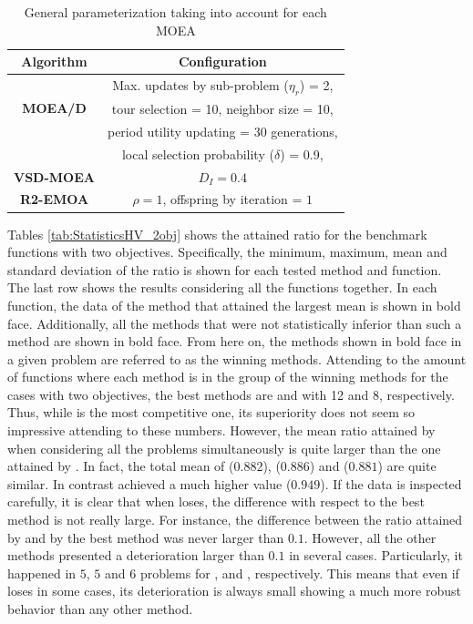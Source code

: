 %
\begin{table}[t]
\centering
\caption{ General parameterization taking into account for each MOEA}
\label{tab:Parametrization}
\begin{tabular}{c|c}
\hline
\textbf{Algorithm} & \textbf{Configuration} \\ \hline
\multirow{3}{*}{\textbf{MOEA/D}} &Max. updates by sub-problem ($\eta_r$) = 2, \\
 & tour selection = 10,   neighbor size = 10, \\
 & period utility updating = 30 generations, \\ 
 & local selection probability ($\delta$) = 0.9,\\ \hline
\textbf{VSD-MOEA} & $D_I=0.4$ \\ \hline
\textbf{R2-EMOA} & $\rho=1$, offspring by iteration = $1$ \\ \hline
\end{tabular}
\end{table}







Tables \ref{tab:StatisticsHV_2obj} shows the attained \HV{} ratio for the benchmark functions
with two objectives.
%
Specifically, the minimum, maximum, mean and standard deviation of the \HV{} ratio is shown for each tested method and function.
%
The last row shows the results considering all the functions together.
%
In each function, the data of the method that attained the largest mean is shown in bold face.
%
Additionally, all the methods that were not statistically inferior than such a method are shown in bold face.
%
From here on, the methods shown in bold face in a given problem are referred to as the winning methods.
%
Attending to the amount of functions where each method is in the group of the winning methods for the cases 
with two objectives, the best methods are \VSDMOEA{} and \RMOEA{} with 12 and 8, respectively.
%
Thus, while \VSDMOEA{} is the most competitive one, its superiority does not seem so impressive
attending to these numbers.
%
However, the mean \HV{} ratio attained by \VSDMOEA{} when considering all the problems simultaneously is quite larger
than the one attained by \RMOEA{}.
%
In fact, the total mean of \RMOEA{} ($0.882$), \NSGAII{} ($0.886$) and \MOEAD{} ($0.881$) are quite similar.
%
In contrast \VSDMOEA{} achieved a much higher value ($0.949$).
%
If the data is inspected carefully, it is clear that when \VSDMOEA{} loses, the difference with respect to the
best method is not really large.
%
For instance, the difference between the \HV{} ratio attained by \VSDMOEA{} and by the best method was never larger
than $0.1$.
%
However, all the other methods presented a deterioration larger than $0.1$ in several cases.
%
Particularly, it happened in $5$, $5$ and $6$ problems for \RMOEA{}, \NSGAII{} and \MOEAD{}, respectively.
%
This means that even if \VSDMOEA{} loses in some cases, its deterioration is always small showing a much more 
robust behavior than any other method.

